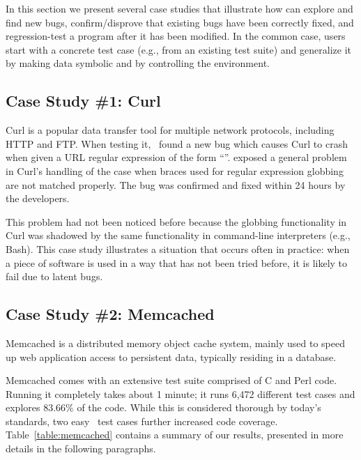 In this section we present several case studies that illustrate how \cnine can explore and find new bugs, confirm/disprove that existing bugs have been correctly fixed, and regression-test a program after it has been modified.  In the common case, \cnine users start with a concrete test case (e.g., from an existing test suite) and generalize it by making data symbolic and by controlling the environment.

\subsection{Case Study \#1: Curl}
\label{sec:eval:curl}

Curl is a popular data transfer tool for multiple network protocols, including HTTP and FTP.  When testing it, \cnine\ found a new bug which causes Curl to crash when given a URL regular expression of the form ``''. \cnine exposed a general problem in Curl's handling of the case when braces used for regular expression globbing are not matched properly.  The bug was confirmed and fixed within 24 hours by the developers. 

This problem had not been noticed before because the globbing functionality in Curl was shadowed by the same functionality in command-line interpreters (e.g., Bash).  This case study illustrates a situation that occurs often in practice: when a piece of software is used in a way that has not been tried before, it is likely to fail due to latent bugs.

\subsection{Case Study \#2: Memcached}
\label{sec:eval:memcached}

Memcached is a distributed memory object cache system, mainly used to speed up web application access to persistent
data, typically residing in a database. %

Memcached comes with an extensive test suite comprised of C and Perl code. Running it completely takes about 1 minute; it runs 6,472 different test cases  and explores $83.66\%$ of the code. While this is considered thorough by today's standards, two easy \cnine\ test cases further increased code coverage. Table~\ref{table:memcached} contains a summary of our results, presented in more details in the following paragraphs.


